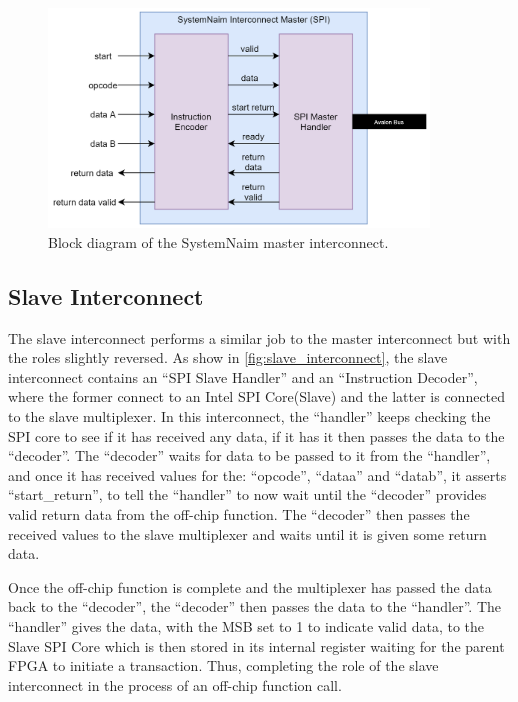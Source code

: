 \begin{figure}[!htb]
    \centering
    \includegraphics[width=0.9\textwidth]{04_Implementation/images/interconnect_block_diagram.png}
    \caption{Block diagram of the SystemNaim master interconnect.}
    \label{fig:master_interconnect}
\end{figure}

\subsection{Slave Interconnect}

The slave interconnect performs a similar job to the master interconnect but with the roles slightly reversed. As show in \autoref{fig:slave_interconnect}, the slave interconnect contains an “SPI Slave Handler” and an “Instruction Decoder”, where the former connect to an Intel SPI Core(Slave) and the latter is connected to the slave multiplexer. In this interconnect, the “handler” keeps checking the SPI core to see if it has received any data, if it has it then passes the data to the “decoder”. The “decoder” waits for data to be passed to it from the “handler”, and once it has received values for the: “opcode”, “dataa” and “datab”, it asserts “start\_return”, to tell the “handler” to now wait until the “decoder” provides valid return data from the off-chip function. The “decoder” then passes the received values to the slave multiplexer and waits until it is given some return data.

Once the off-chip function is complete and the multiplexer has passed the data back to the “decoder”, the “decoder” then passes the data to the “handler”. The “handler” gives the data, with the MSB set to 1 to indicate valid data, to the Slave SPI Core which is then stored in its internal register waiting for the parent FPGA to initiate a transaction. Thus, completing the role of the slave interconnect in the process of an off-chip function call.

